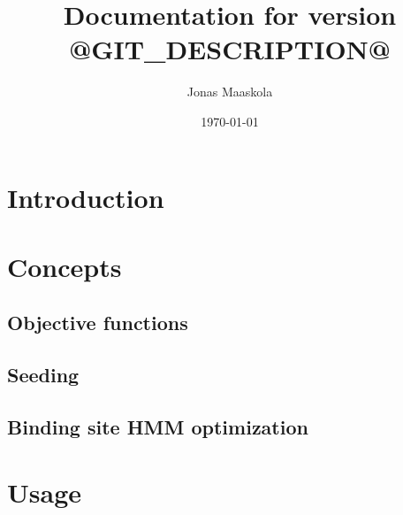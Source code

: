\documentclass[a4paper]{article}
\title{Documentation for \dlhmm{} version @GIT_DESCRIPTION@}
\author{Jonas Maaskola}
\date{\today}
\begin{document}
\maketitle

\begin{abstract}
\end{abstract}

\tableofcontents

\section{Introduction}

\section{Concepts}
\subsection{Objective functions}
\subsection{Seeding}
\subsection{Binding site HMM optimization}

\section{Usage}
\end{document}
